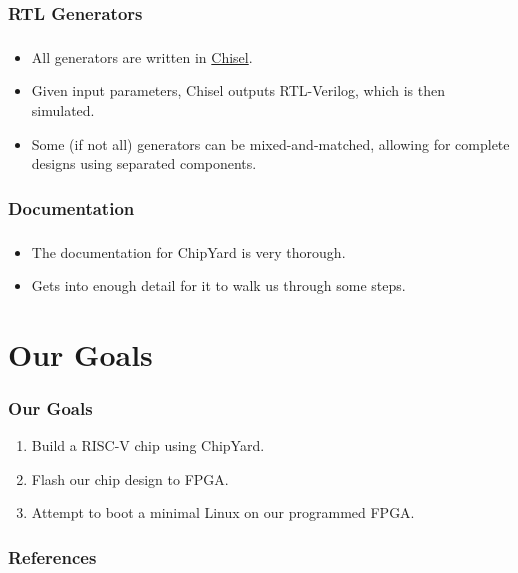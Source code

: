 \documentclass{weeklyslides}
\begin{document}
\subsubsection{RTL Generators}\label{subsubsec:RTL Generators}
\begin{frame}
  \frametitle{}
  \begin{itemize}
  \item All generators are written in \href{https://www.chisel-lang.org/}{Chisel}.
  \item Given input parameters, Chisel outputs RTL-Verilog, which is then simulated.
  \item Some (if not all) generators can be mixed-and-matched, allowing for complete designs using separated components.
  \end{itemize}
\end{frame}


\subsubsection{Documentation}\label{subsubsec:Doc}
\begin{frame}
  \frametitle{}
  \begin{itemize}
  \item The documentation for ChipYard is very thorough.
  \item Gets into enough detail for it to walk us through some steps.
  \end{itemize}
\end{frame}


\section{Our Goals}\label{sec:Our_Goals}
\begin{frame}
  \frametitle{Our Goals}
  \begin{enumerate}
  \item Build a RISC-V chip using ChipYard.
  \item Flash our chip design to FPGA.\@
  \item Attempt to boot a minimal Linux on our programmed FPGA.\@
  \end{enumerate}

\end{frame}

\begin{frame}
  \frametitle{References}
  \printbibliography[heading=bibintoc]{}
\end{frame}
\end{document}
